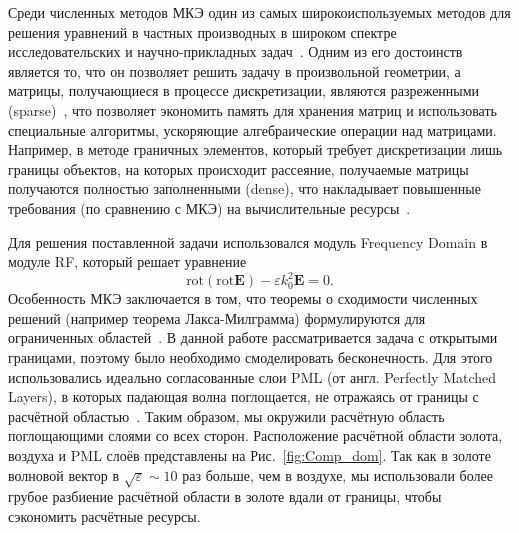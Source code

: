 Среди численных методов МКЭ один из самых широкоиспользуемых методов для решения уравнений в частных производных в широком спектре исследовательских и научно-прикладных задач~\cite{zenkevich}. Одним из его достоинств является то, что он позволяет решить задачу в произвольной геометрии, а матрицы, получающиеся в процессе дискретизации, являются разреженными (sparse)~\cite{zienkiewicz2005finite}, что позволяет экономить память для хранения матриц и использовать специальные алгоритмы, ускоряющие алгебраические операции над матрицами. Например, в методе граничных элементов, который требует дискретизации лишь границы объектов, на которых происходит рассеяние, получаемые матрицы получаются полностью заполненными (dense), что накладывает повышенные требования (по сравнению с МКЭ) на вычислительные ресурсы~\cite{marburg2008computational}.

Для решения поставленной задачи использовался модуль Frequency Domain в модуле RF, который решает уравнение
\begin{equation}
    \text{rot}(\text{rot}\mathbf{E}) - \varepsilon k_0^2 \mathbf{E} = 0.
    \label{eq:Helmholtz_rot}
\end{equation}
Особенность МКЭ заключается в том, что теоремы о сходимости численных решений (например теорема Лакса-Милграмма) формулируются для ограниченных областей~\cite{ciarlet2002finite}. В данной работе рассматривается задача с открытыми границами, поэтому было необходимо смоделировать бесконечность. Для этого использовались идеально согласованные слои PML (от англ. Perfectly Matched Layers), в которых падающая волна поглощается, не отражаясь от границы с расчётной областью~\cite{comsol_book}. Таким образом, мы окружили расчётную область поглощающими слоями со всех сторон. Расположение расчётной области золота, воздуха и PML слоёв представлены на Рис.~\ref{fig:Comp_dom}. Так как в золоте волновой вектор в $\sqrt{\varepsilon} \sim 10$ раз больше, чем в воздухе, мы использовали более грубое разбиение расчётной области в золоте вдали от границы, чтобы сэкономить расчётные ресурсы. 

